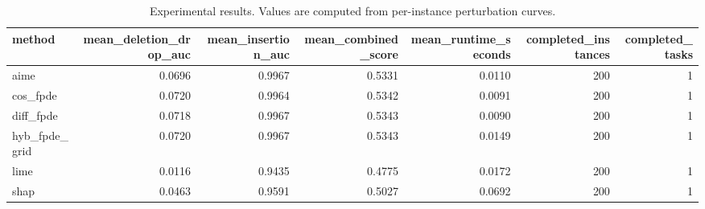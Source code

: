 \begin{table}[t]
\caption{Experimental results. Values are computed from per-instance perturbation curves.}
\label{tab:main_results_computed}
\centering
\begin{tabular}{lrrrrrr}
\toprule
method & mean\_deletion\_drop\_auc & mean\_insertion\_auc & mean\_combined\_score & mean\_runtime\_seconds & completed\_instances & completed\_tasks \\
\midrule
aime & 0.0696 & 0.9967 & 0.5331 & 0.0110 & 200 & 1 \\
cos\_fpde & 0.0720 & 0.9964 & 0.5342 & 0.0091 & 200 & 1 \\
diff\_fpde & 0.0718 & 0.9967 & 0.5343 & 0.0090 & 200 & 1 \\
hyb\_fpde\_grid & 0.0720 & 0.9967 & 0.5343 & 0.0149 & 200 & 1 \\
lime & 0.0116 & 0.9435 & 0.4775 & 0.0172 & 200 & 1 \\
shap & 0.0463 & 0.9591 & 0.5027 & 0.0692 & 200 & 1 \\
\bottomrule
\end{tabular}

\end{table}
